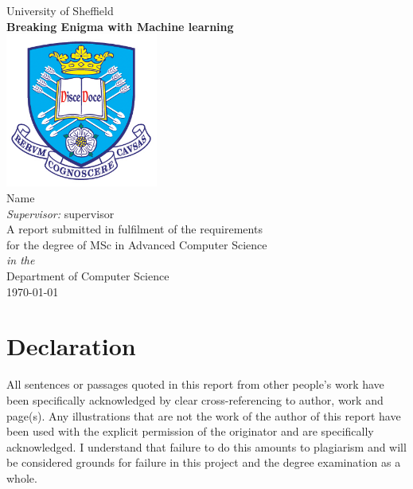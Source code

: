 \documentclass[11pt,oneside]{book}
\begin{document}
\frontmatter

\begin{titlepage}


\begin{center}
{\LARGE University of Sheffield}\\[1.5cm]
\linespread{1.2}\huge {\bfseries Breaking Enigma with Machine learning}\\[1.5cm]
\linespread{1}
\includegraphics[width=5cm]{images/tuoslogo.png}\\[1cm]
{\Large Name}\\[1cm]
{\large \emph{Supervisor:} supervisor}\\[1cm]
\large A report submitted in fulfilment of the requirements\\ for the degree of MSc in Advanced Computer Science\\[0.3cm] 
\textit{in the}\\[0.3cm]
Department of Computer Science\\[2cm]
\today
\end{center}

\end{titlepage}


\newpage
\chapter*{\Large Declaration}


All sentences or passages quoted in this report from other people's work have been specifically acknowledged by clear cross-referencing to author, work and page(s). Any illustrations that are not the work of the author of this report have been used with the explicit permission of the originator and are specifically acknowledged. I understand that failure to do this amounts to plagiarism and will be considered grounds for failure in this project and the degree examination as a whole.\\[1cm]
\end{document}
